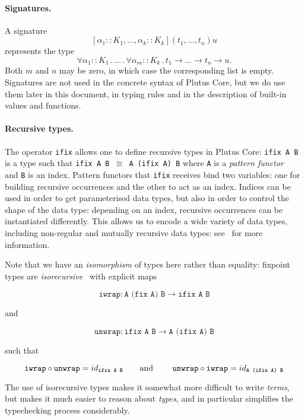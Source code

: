 \documentclass[a4paper]{article}
\begin{document}
\paragraph{Signatures.}  A signature
$$[\alpha_1::K_1, \ldots, \alpha_k::K_k](t_1, \ldots, t_n)u$$ represents
the type
$$\forall \alpha_1::K_1\,.\, \ldots \,.\, \forall \alpha_m::K_k\,.\, t_1
\rightarrow \ldots \rightarrow t_n \rightarrow u.$$
Both $m$ and $n$
may be zero, in which case the corresponding list is empty.
Signatures are not used in the concrete syntax of Plutus Core, but we
do use them later in this document, in typing rules and in the
description of built-in values and functions.

\paragraph{Recursive types.}
\label{sec:ifix-note}
\noindent
The operator \texttt{ifix} allows one to define recursive types in
Plutus Core: \texttt{ifix A B} is a type such that \texttt{ifix A B
  $\cong$ A (ifix A) B} where \texttt{A} is a \textit{pattern
  functor}~\citep[2.4]{backhouseetal98} and \texttt{B} is an
index. Pattern functors that \texttt{ifix} receives bind two
variables: one for building recursive occurrences and the other to act
as an index. Indices can be used in order to get parameterised data
types, but also in order to control the shape of the data type:
depending on an index, recursive occurrences can be instantiated
differently.  This allows us to encode a wide variety of data types,
including non-regular and mutually recursive data types:
see~\citep[3.1]{unravelling-recursion} for more information.

Note that we have an \textit{isomorphism} of types here rather than
equality: fixpoint types are
\textit{isorecursive}~\citep[20.2]{Pierce:TAPL} with explicit maps

$$
\texttt{iwrap} : \texttt{A (fix A) B} \rightarrow \texttt{ifix A B}
$$

\noindent and

$$
\texttt{unwrap} : \texttt{ifix A B} \rightarrow  \texttt{A (ifix A) B}
$$

\noindent such that

$$
\texttt{iwrap} \circ \texttt{unwrap} = id_{ \texttt{ifix A B}}
\mbox{\qquad and \qquad}
\texttt{unwrap} \circ \texttt{iwrap} = id_{ \texttt{A (ifix A) B}}
$$

\noindent The use of isorecursive types makes it somewhat more difficult to
write \textit{terms}, but makes it much easier to reason about
\textit{types}, and in particular simplifies the typechecking process
considerably.
\end{document}
